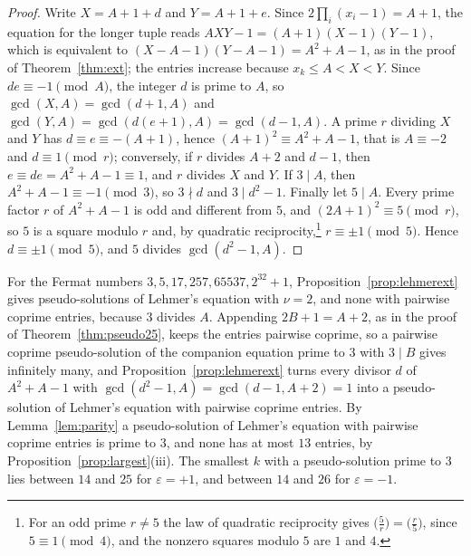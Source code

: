 \documentclass[11pt,reqno]{amsart}
\numberwithin{equation}{section}
\theoremstyle{plain}
\theoremstyle{definition}
\theoremstyle{remark}
\begin{document}
\begin{proof}
Write $X=A+1+d$ and $Y=A+1+e$. Since $2\prod_i(x_i-1)=A+1$, the
equation for the longer tuple reads $AXY-1=(A+1)(X-1)(Y-1)$, which is
equivalent to $(X-A-1)(Y-A-1)=A^2+A-1$, as in the proof of
Theorem~\ref{thm:ext}; the entries increase because $x_k\le A<X<Y$.
Since $de\equiv-1\pmod A$, the integer $d$ is prime to $A$, so
$\gcd(X,A)=\gcd(d+1,A)$ and $\gcd(Y,A)=\gcd(d(e+1),A)=\gcd(d-1,A)$.
A prime $r$ dividing $X$ and $Y$ has $d\equiv e\equiv-(A+1)$, hence
$(A+1)^2\equiv A^2+A-1$, that is $A\equiv-2$ and $d\equiv1\pmod r$;
conversely, if $r$ divides $A+2$ and $d-1$, then
$e\equiv de=A^2+A-1\equiv1$, and $r$ divides $X$ and $Y$. If $3\mid A$,
then $A^2+A-1\equiv-1\pmod3$, so $3\nmid d$ and $3\mid d^2-1$. Finally
let $5\mid A$. Every prime factor $r$ of $A^2+A-1$ is odd and different
from $5$, and $(2A+1)^2\equiv5\pmod r$, so $5$ is a square modulo $r$
and, by quadratic reciprocity,\footnote{For an odd prime $r\ne5$ the
law of quadratic reciprocity gives $\bigl(\frac5r\bigr)=\bigl(\frac
r5\bigr)$, since $5\equiv1\pmod4$, and the nonzero squares modulo $5$
are $1$ and $4$.} $r\equiv\pm1\pmod5$. Hence
$d\equiv\pm1\pmod5$, and $5$ divides $\gcd(d^2-1,A)$.
\end{proof}

For the Fermat numbers $3,5,17,257,65537,2^{32}+1$,
Proposition~\ref{prop:lehmerext} gives pseudo-solutions of Lehmer's
equation with $\nu=2$, and none with pairwise coprime entries, because
$3$ divides $A$. Appending $2B+1=A+2$, as in the proof of
Theorem~\ref{thm:pseudo25}, keeps the entries pairwise coprime, so a
pairwise coprime pseudo-solution of the companion equation
prime to $3$ with $3\mid B$ gives infinitely many, and
Proposition~\ref{prop:lehmerext} turns every divisor $d$ of $A^2+A-1$
with $\gcd(d^2-1,A)=\gcd(d-1,A+2)=1$ into a pseudo-solution of
Lehmer's equation with pairwise coprime entries. By
Lemma~\ref{lem:parity} a pseudo-solution of Lehmer's equation with
pairwise coprime entries is prime to $3$, and none has at most $13$
entries, by Proposition~\ref{prop:largest}(iii). The smallest $k$ with a pseudo-solution prime to $3$ lies
between $14$ and $25$ for $\varepsilon=+1$, and between $14$ and $26$
for $\varepsilon=-1$.
\end{document}
